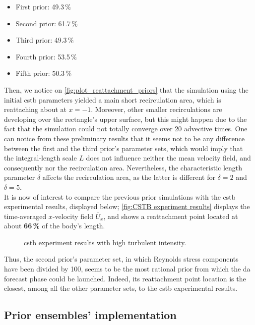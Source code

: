 \documentclass[12pt,twoside]{report}
\begin{document}
\begin{itemize}[noitemsep]
    \item[$-$] First prior: 49.3\,\%
    \item[$-$] Second prior: 61.7\,\%
    \item[$-$] Third prior: 49.3\,\%
    \item[$-$] Fourth prior: 53.5\,\%
    \item[$-$] Fifth prior: 50.3\,\%
\end{itemize}

Then, we notice on \autoref{fig:plot_reattachment_priors} that the simulation using the initial \gls{cstb} parameters yielded a main short recirculation area, which is reattaching about at $x=-1$. Moreover, other smaller recirculations are developing over the rectangle's upper surface, but this might happen due to the fact that the simulation could not totally converge over 20 advective times. One can notice from these preliminary results that it seems not to be any difference between the first and the third prior's parameter sets, which would imply that the integral-length scale $L$ does not influence neither the mean velocity field, and consequently nor the recirculation area. Nevertheless, the characteristic length parameter $\delta$ affects the recirculation area, as the latter is different for $\delta=2$ and $\delta=5$. \\

It is now of interest to compare the previous prior simulations with the \gls{cstb} experimental results, displayed below; \autoref{fig:CSTB experiment results} displays the time-averaged $x$-velocity field $\bar{U}_x$, and shows a reattachment point located at about \textbf{66\,\%} of the body's length.
\begin{figure}[h!]
    \centering
    
    \caption{\gls{cstb} experiment results with high turbulent intensity.}
    \label{fig:CSTB experiment results}
\end{figure}

Thus, the second prior's parameter set, in which Reynolds stress components have been divided by 100, seems to be the most rational prior from which the \gls{da} forecast phase could be launched. Indeed, its reattachment point location is the closest, among all the other parameter sets, to the \gls{cstb} experimental results. 

\subsection{Prior ensembles' implementation} \label{subsec:param_distrib}
\end{document}
